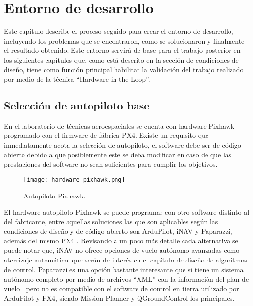 \chapter{Entorno de desarrollo}

Este capítulo describe el proceso seguido para crear el entorno de desarrollo, incluyendo los problemas que se encontraron, como se solucionaron y finalmente el resultado obtenido. Este entorno servirá de base para el trabajo posterior en los siguientes capítulos que, como está descrito en la sección de condiciones de diseño, tiene como función principal habilitar la validación del trabajo realizado por medio de la técnica ``Hardware-in-the-Loop''.

\section{Selección de autopiloto base}

En el laboratorio de técnicas aeroespaciales se cuenta con hardware Pixhawk programado con el firmware de fábrica PX4. Existe un requisito que inmediatamente acota la selección de autopiloto, el software debe ser de código abierto debido a que posiblemente este se deba modificar en caso de que las prestaciones del software no sean suficientes para cumplir los objetivos.

\begin{figure}[h]
    \centering
    \texttt{[image: hardware-pixhawk.png]}
    \caption[Autopiloto Pixhawk.]{Autopiloto Pixhawk.\footnotemark}
    \label{fig:pixhawk1}
\end{figure}

El hardware autopiloto Pixhawk se puede programar con otro software distinto al del fabricante, entre aquellas soluciones las que son aplicables según las condiciones de diseño y de código abierto son ArduPilot, iNAV y Paparazzi, además del mismo PX4 \cite{survey}. Revisando a un poco más detalle cada alternativa se puede notar que, iNAV no ofrece opciones de vuelo autónomo avanzadas como aterrizaje automático, que serán de interés en el capítulo de diseño de algoritmos de control. Paparazzi es una opción bastante interesante que si tiene un sistema autónomo completo por medio de archivos ``XML'' con la información del plan de vuelo \cite{paparazzi_flight_plan}, pero no es compatible con el software de control en tierra utilizado por ArduPilot y PX4, siendo Mission Planner y QGroundControl los principales.

